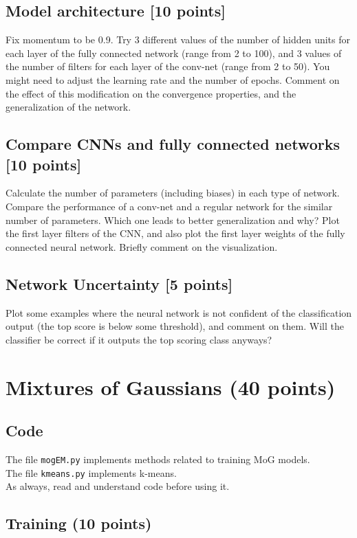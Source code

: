 \documentclass[12pt]{article}
\begin{document}
\subsection{Model architecture [10 points]}
Fix momentum to be 0.9. Try 3 different values of the 
number of hidden units for each layer of
the fully connected network (range from 2 to 100), and 3 values of the
number of 
filters for each layer of the conv-net (range from 2 to 50). You might need to 
adjust the learning rate and the number of epochs. Comment on the effect of 
this modification on the convergence properties, and the generalization of the 
network.

\subsection{Compare CNNs and fully connected networks [10 points]}
Calculate the number of parameters (including biases) in each type of network. 
Compare the performance of a conv-net and a regular network for the 
similar number of parameters. Which one leads to better generalization and why?
Plot the first layer filters of the CNN, and also plot the first layer weights 
of the fully connected neural network. Briefly comment on the visualization.

\subsection{Network Uncertainty [5 points]}
Plot some examples where the neural network is not confident of the 
classification output (the top score is below some threshold), and comment on 
them. Will the classifier be correct if it outputs the top scoring class 
anyways?

\section{Mixtures of Gaussians (40 points)}

\subsection{Code}

The file {\tt mogEM.py} implements methods related to training MoG models.\\
The file {\tt kmeans.py} implements k-means.\\
As always, read and understand code before using it.

\subsection{Training (10 points)}
\end{document}

